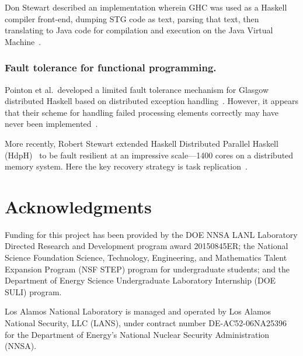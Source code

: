 \documentclass{llncs}
\begin{document}
Don Stewart described an implementation wherein GHC was used as a Haskell
compiler front-end, dumping STG code as text, parsing that text, then
translating to Java code for compilation and execution on the Java Virtual
Machine~\cite{Stewart-BSc}.

\vspace{-0.1in}
\subsubsection{Fault tolerance for functional programming.}
Pointon et al.\ developed a limited fault tolerance mechanism for Glasgow
distributed Haskell based on distributed exception
handling~\cite{Pointon:2001}.  However, it appears that their scheme for
handling failed processing elements correctly may have
never been implemented~\cite{Trinder:2000}.

More recently, Robert Stewart extended Haskell Distributed Parallel Haskell
(HdpH)~\cite{hdph} to be fault resilient at an impressive scale---1400 cores
on a distributed memory system.  Here the key recovery strategy is task
replication~\cite{Stewart:2013}.

\section{Acknowledgments}

Funding for this project has been provided by the DOE NNSA LANL Laboratory
Directed Research and Development program award 20150845ER; the National
Science Foundation Science, Technology, Engineering, and Mathematics Talent
Expansion Program (NSF STEP) program for undergraduate students; and the Department of Energy
Science Undergraduate Laboratory Internship (DOE SULI) program.

Los Alamos National Laboratory is managed and operated by Los Alamos National
Security, LLC (LANS), under contract number DE-AC52-06NA25396 for the
Department of Energy's National Nuclear Security Administration (NNSA).


%
%

\appendix
\end{document}

